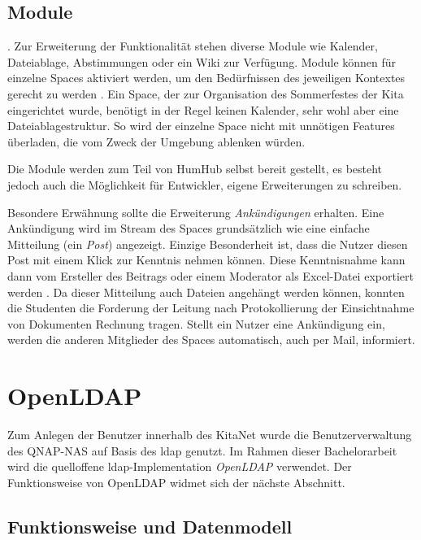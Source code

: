 \subsection{Module}

 \citep[][]{modules}. 
Zur Erweiterung der Funktionalität stehen diverse Module wie Kalender, Dateiablage, Abstimmungen oder ein Wiki zur Verfügung.
Module können für einzelne Spaces aktiviert werden, um den Bedürfnissen des jeweiligen Kontextes gerecht zu werden \citep[vgl.][f.]{modules}. Ein Space, der zur Organisation des Sommerfestes der Kita eingerichtet wurde, benötigt \zb in der Regel keinen Kalender, sehr wohl aber eine Dateiablagestruktur.
So wird der einzelne Space nicht mit unnötigen Features überladen, die vom Zweck der Umgebung ablenken würden. 

Die Module werden zum Teil von HumHub selbst bereit gestellt, es besteht jedoch auch die Möglichkeit für Entwickler, eigene Erweiterungen zu schreiben.

Besondere Erwähnung sollte die Erweiterung \textit{Ankündigungen} erhalten. 
Eine Ankündigung wird im Stream des Spaces grundsätzlich wie eine einfache Mitteilung (ein \textit{Post}) angezeigt. 
Einzige Besonderheit ist, dass die Nutzer diesen Post mit einem Klick zur Kenntnis nehmen können. 
Diese Kenntnisnahme kann dann vom Ersteller des Beitrags oder einem Moderator \zb als Excel-Datei exportiert werden  \citep[Quellcode unter][]{announcement}. 
Da dieser Mitteilung auch Dateien angehängt werden können, konnten die Studenten die Forderung der Leitung nach Protokollierung der Einsichtnahme von Dokumenten Rechnung tragen.
Stellt ein Nutzer eine Ankündigung ein, werden die anderen Mitglieder des Spaces automatisch, auch per Mail, informiert.


\section{OpenLDAP}

Zum Anlegen der Benutzer innerhalb des KitaNet wurde die Benutzerverwaltung des QNAP-NAS auf Basis des \acf{ldap} genutzt. Im Rahmen dieser Bachelorarbeit wird die quelloffene \ac{ldap}-Implementation \textit{OpenLDAP} verwendet. Der Funktionsweise von OpenLDAP widmet sich der nächste Abschnitt.

\subsection{Funktionsweise und Datenmodell}

